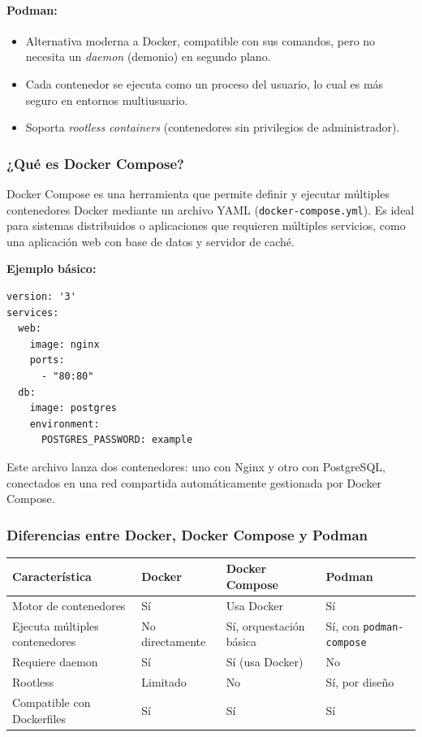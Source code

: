 \paragraph{Podman:}
\begin{itemize}
    \item Alternativa moderna a Docker, compatible con sus comandos, pero no necesita un \textit{daemon} (demonio) en segundo plano.
    \item Cada contenedor se ejecuta como un proceso del usuario, lo cual es más seguro en entornos multiusuario.
    \item Soporta \textit{rootless containers} (contenedores sin privilegios de administrador).
\end{itemize}

\subsubsection{¿Qué es Docker Compose?}
Docker Compose es una herramienta que permite definir y ejecutar múltiples contenedores Docker mediante un archivo YAML (\texttt{docker-compose.yml}). Es ideal para sistemas distribuidos o aplicaciones que requieren múltiples servicios, como una aplicación web con base de datos y servidor de caché.

\textbf{Ejemplo básico:}
\begin{lstlisting}[style=customstyle]
version: '3'
services:
  web:
    image: nginx
    ports:
      - "80:80"
  db:
    image: postgres
    environment:
      POSTGRES_PASSWORD: example
\end{lstlisting}

Este archivo lanza dos contenedores: uno con Nginx y otro con PostgreSQL, conectados en una red compartida automáticamente gestionada por Docker Compose.

\subsubsection{Diferencias entre Docker, Docker Compose y Podman}
\begin{table}[h!]
\centering
\begin{tabular}{|p{3cm}|p{3cm}|p{3cm}|p{3cm}|}
\hline
\textbf{Característica} & \textbf{Docker} & \textbf{Docker Compose} & \textbf{Podman} \\ \hline
Motor de contenedores & Sí & Usa Docker & Sí \\ \hline
Ejecuta múltiples contenedores & No directamente & Sí, orquestación básica & Sí, con \texttt{podman-compose} \\ \hline
Requiere daemon & Sí & Sí (usa Docker) & No \\ \hline
Rootless & Limitado & No & Sí, por diseño \\ \hline
Compatible con Dockerfiles & Sí & Sí & Sí \\ \hline
\end{tabular}
\end{table}

